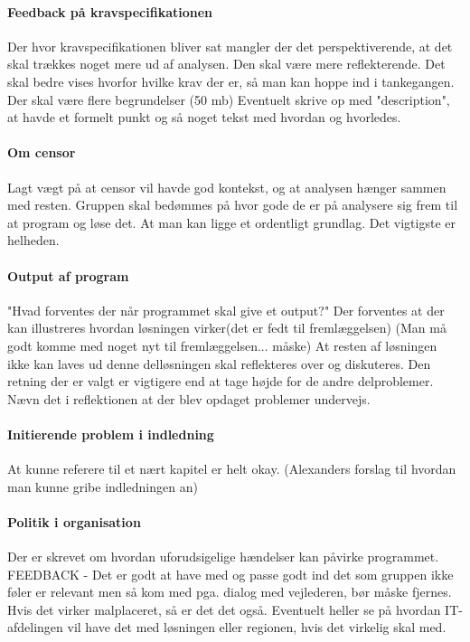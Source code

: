 \documentclass[article,11pt]{memoir}
\begin{document}
\paragraph{Feedback på kravspecifikationen}
Der hvor kravspecifikationen bliver sat mangler der det perspektiverende, at det skal trækkes noget mere ud af analysen. Den skal være mere reflekterende. Det skal bedre vises hvorfor hvilke krav der er, så man kan hoppe ind i tankegangen. Der skal være flere begrundelser (50 mb)
Eventuelt skrive op med "description", at havde et formelt punkt og så noget tekst med hvordan og hvorledes.


\paragraph{Om censor}
Lagt vægt på at censor vil havde god kontekst, og at analysen hænger sammen med resten. Gruppen skal bedømmes på hvor gode de er på analysere sig frem til at program og løse det. At man kan ligge et ordentligt grundlag. Det vigtigste er helheden.


\paragraph{Output af program}
"Hvad forventes der når programmet skal give et output?"
Der forventes at der kan illustreres hvordan løsningen virker(det er fedt til fremlæggelsen)
(Man må godt komme med noget nyt til fremlæggelsen... måske)
At resten af løsningen ikke kan laves ud denne delløsningen skal reflekteres over og diskuteres.
Den retning der er valgt er vigtigere end at tage højde for de andre delproblemer. Nævn det i reflektionen at der blev opdaget problemer undervejs.


\paragraph{Initierende problem i indledning}
At kunne referere til et nært kapitel er helt okay. (Alexanders forslag til hvordan man kunne gribe indledningen an)


\paragraph{Politik i organisation}
Der er skrevet om hvordan uforudsigelige hændelser kan påvirke programmet. FEEDBACK - Det er godt at have med og passe godt ind
det som gruppen ikke føler er relevant men så kom med pga. dialog med vejlederen, bør måske fjernes. Hvis det virker malplaceret, så er det det også.
Eventuelt heller se på hvordan IT-afdelingen vil have det med løsningen eller regionen, hvis det virkelig skal med.
\end{document}
